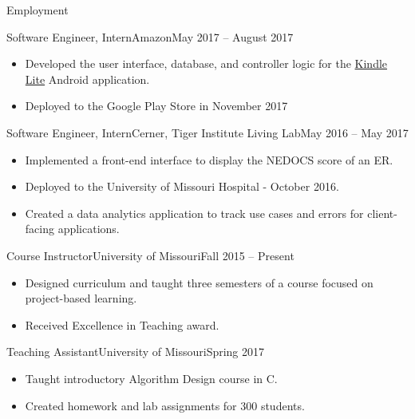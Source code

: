 \documentclass[]{mcdowellcv}
\begin{document}
    \begin{cvsection}{Employment}
        \begin{cvsubsection}{Software Engineer, Intern}{Amazon}{May 2017 -- August 2017}
            \begin{itemize}
            \item Developed the user interface, database, and controller logic for the \href{https://play.google.com/store/apps/details?id=com.amazon.klite&hl=en}{Kindle Lite} Android application.
            \item Deployed to the Google Play Store in November 2017
            \end{itemize}
        \end{cvsubsection}

        \begin{cvsubsection}{Software Engineer, Intern}{Cerner, Tiger Institute Living Lab}{May 2016 -- May 2017}		
            \begin{itemize}
                \item Implemented a front-end interface to display the NEDOCS score of an ER.
                \item Deployed to the University of Missouri Hospital - October 2016.
                \item Created a data analytics application to track use cases and errors for client-facing applications.
            \end{itemize}
        \end{cvsubsection}

        \begin{cvsubsection}{Course Instructor}{University of Missouri}{Fall 2015 -- Present}
            \begin{itemize}
                \item Designed curriculum and taught three semesters of a course focused on project-based learning.
                \item Received Excellence in Teaching award.
            \end{itemize}
        \end{cvsubsection}
        
        \begin{cvsubsection}{Teaching Assistant}{University of Missouri}{Spring 2017}
            \begin{itemize}
                \item Taught introductory Algorithm Design course in C.
                \item Created homework and lab assignments for 300 students.
            \end{itemize}
        \end{cvsubsection}

    \end{cvsection}	
    
\end{document}
